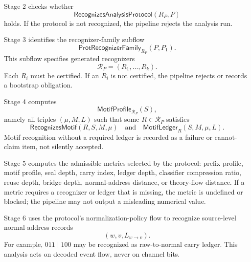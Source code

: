 \begin{definition}
\label{def:analysis-pipeline-stage-protocol}
Stage 2 checks whether
$$
  \mathsf{RecognizesAnalysisProtocol}(R_P,P)
$$
holds. If the protocol is not recognized, the pipeline rejects the analysis run.
\end{definition}

\begin{definition}
\label{def:analysis-pipeline-stage-recognizer-family}
Stage 3 identifies the recognizer-family subflow
$$
  \mathsf{ProtRecognizerFamily}_{R_P}(P,P_1).
$$
This subflow specifies generated recognizers
$$
  \mathcal R_P=(R_1,\ldots,R_k).
$$
Each $R_i$ must be certified. If an $R_i$ is not certified, the pipeline rejects or records a bootstrap obligation.
\end{definition}

\begin{definition}
\label{def:analysis-pipeline-stage-motif-extraction}
Stage 4 computes
$$
  \mathsf{MotifProfile}_{\mathcal R_P}(S),
$$
namely all triples $(\mu,M,L)$ such that some $R\in\mathcal R_P$ satisfies
$$
  \mathsf{RecognizesMotif}(R,S,M,\mu)
  \quad\text{and}\quad
  \mathsf{MotifLedger}_{R}(S,M,\mu,L).
$$
Motif recognition without a required ledger is recorded as a failure or cannot-claim item, not silently accepted.
\end{definition}

\begin{definition}
\label{def:analysis-pipeline-stage-metrics}
Stage 5 computes the admissible metrics selected by the protocol: prefix profile, motif profile, seal depth, carry index, ledger depth, classifier compression ratio, reuse depth, bridge depth, normal-address distance, or theory-flow distance. If a metric requires a recognizer or ledger that is missing, the metric is undefined or blocked; the pipeline may not output a misleading numerical value.
\end{definition}

\begin{definition}
\label{def:analysis-pipeline-stage-normal-address}
Stage 6 uses the protocol's normalization-policy flow to recognize source-level normal-address records
$$
  (w,v,L_{w\to v}).
$$
For example, $011\mid 100$ may be recognized as raw-to-normal carry ledger. This analysis acts on decoded event flow, never on channel bits.
\end{definition}

